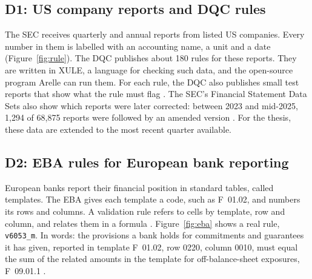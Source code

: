 \documentclass[11pt,a4paper]{article}
\let\oldsubsection\subsection
\renewcommand{\subsection}{\FloatBarrier\oldsubsection}
\begin{document}
\subsection{D1: US company reports and DQC rules}
\label{sec:d1}

The SEC receives quarterly and annual reports from listed US companies. Every number in them is labelled with an accounting name, a unit and a date (Figure~\ref{fig:rule}). The DQC publishes about 180 rules for these reports. They are written in XULE, a language for checking such data, and the open-source program Arelle can run them. For each rule, the DQC also publishes small test reports that show what the rule must flag \cite{dqc,arelle}. The SEC's Financial Statement Data Sets also show which reports were later corrected: between 2023 and mid-2025, 1,294 of 68,875 reports were followed by an amended version \cite{pilotreport,fsds}. For the thesis, these data are extended to the most recent quarter available.

\subsection{D2: EBA rules for European bank reporting}
\label{sec:eba}

European banks report their financial position in standard tables, called templates. The EBA gives each template a code, such as F~01.02, and numbers its rows and columns. A validation rule refers to cells by template, row and column, and relates them in a formula \cite{eba,ebadpm}. Figure~\ref{fig:eba} shows a real rule, \texttt{v6053\_m}. In words: the provisions a bank holds for commitments and guarantees it has given, reported in template F~01.02, row 0220, column 0010, must equal the sum of the related amounts in the template for off-balance-sheet exposures, F~09.01.1 \cite{ebaqa}.
\end{document}
